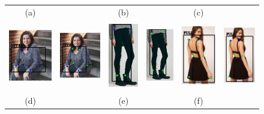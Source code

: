 \documentclass[conference]{IEEEtran}
\begin{document}
\begin{figure}
\begin{tabular} {cccccc}
(a) &  & (b) & & (c) &\\
{\includegraphics[align=c, width = 0.9in, height= 3cm]{images/gt_4.PNG}} &
{\includegraphics[align=c, width = 0.9in, height= 3cm]{images/p_4.PNG}} &
{\includegraphics[align=c, width = 0.6in, height= 3cm]{images/gt_5.PNG}} &
{\includegraphics[align=c, width = 0.6in, height= 3cm]{images/p_5.PNG}} &
{\includegraphics[align=c, width = 0.7in, height= 3cm]{images/gt_6.PNG}} &
{\includegraphics[align=c, width = 0.7in, height= 3cm]{images/p_6.PNG}} \\
(d) &  & (e) & & (f) &\\

\end{tabular}
\end{figure}
\end{document}
